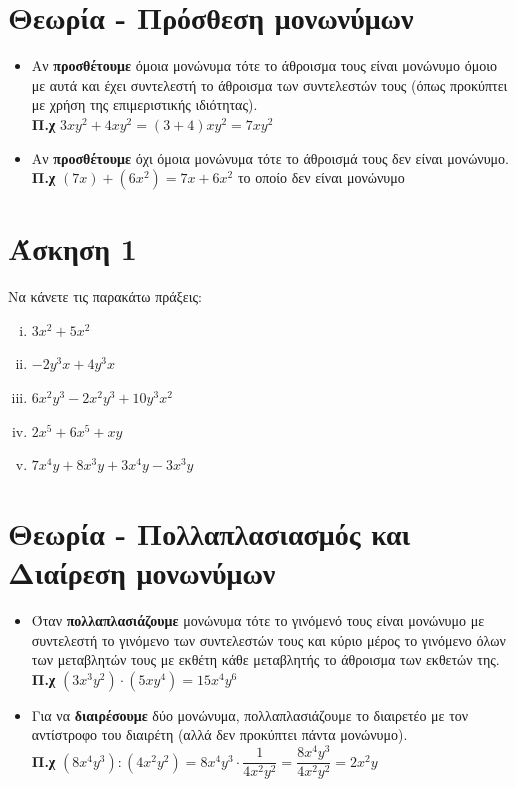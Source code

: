 \documentclass[a4paper,10pt]{report}
\begin{document}
\section*{Θεωρία - Πρόσθεση μονωνύμων \hfill \small{}}
\begin{itemize}
 \item Αν \textbf{προσθέτουμε} όμοια μονώνυμα τότε το άθροισμα τους είναι μονώνυμο όμοιο με αυτά και έχει συντελεστή 
       το άθροισμα των συντελεστών τους (όπως προκύπτει με χρήση της επιμεριστικής ιδιότητας).\\
       \textbf{Π.χ} $3xy^{2}+4xy^{2}=(3+4)xy^{2}=7xy^{2}$
 \item Αν \textbf{προσθέτουμε} όχι όμοια μονώνυμα τότε το άθροισμά τους δεν είναι μονώνυμο.\\
       \textbf{Π.χ} $(7x)+(6x^{2})=7x+6x^{2}$ το οποίο δεν είναι μονώνυμο
\end{itemize}


\section*{Άσκηση 1  \hfill \small{ }}
Να κάνετε τις παρακάτω πράξεις:
\begin{enumerate}[i)]
 \item $3x^{2}+5x^{2}$
 \item $-2y^{3}x+4y^{3}x$
 \item $6x^{2}y^{3}-2x^{2}y^{3}+10y^{3}x^{2}$
 \item $2x^{5}+6x^{5}+xy$
 \item $7x^{4}y+8x^{3}y+3x^{4}y-3x^{3}y$
\end{enumerate}

\section*{Θεωρία - Πολλαπλασιασμός και Διαίρεση μονωνύμων \hfill \small{}}
\begin{itemize}
 \item Όταν \textbf{πολλαπλασιάζουμε} μονώνυμα τότε το γινόμενό τους είναι μονώνυμο με συντελεστή το 
       γινόμενο των συντελεστών τους και κύριο μέρος το γινόμενο όλων των μεταβλητών τους με εκθέτη 
       κάθε μεταβλητής το άθροισμα των εκθετών της.\\
       \textbf{Π.χ} $(3x^{3}y^{2})\cdot (5xy^{4}) =15x^{4}y^{6} $
 \item Για να \textbf{διαιρέσουμε} δύο μονώνυμα, πολλαπλασιάζουμε το διαιρετέο με τον αντίστροφο του 
       διαιρέτη (αλλά δεν προκύπτει πάντα μονώνυμο).\\
       \textbf{Π.χ} $ (8x^{4}y^{3}):(4x^{2}y^{2}) = 8x^{4}y^{3}\cdot \dfrac{1}{4x^{2}y^{2}}=
        \dfrac{8x^{4}y^{3}}{4x^{2}y^{2}}=2x^{2}y$
\end{itemize}
\end{document}
